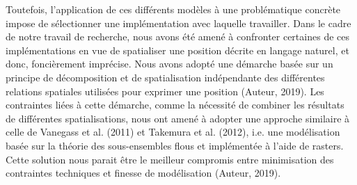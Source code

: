 Toutefois, l’application de ces différents modèles à une problématique
concrète impose de sélectionner une implémentation avec laquelle
travailler. Dans le cadre de notre travail de recherche, nous avons
été amené à confronter certaines de ces implémentations en vue de
spatialiser une position décrite en langage naturel, et donc,
foncièrement imprécise. Nous avons adopté une démarche basée sur un
principe de décomposition et de spatialisation indépendante des
différentes relations spatiales utilisées pour exprimer une position
(Auteur, 2019). Les contraintes liées à cette démarche, comme la
nécessité de combiner les résultats de différentes spatialisations,
nous ont amené à adopter une approche similaire à celle de Vanegass et
al. (2011) et Takemura et al. (2012), i.e. une modélisation basée sur
la théorie des sous-ensembles flous et implémentée à l’aide de
rasters. Cette solution nous parait être le meilleur compromis entre
minimisation des contraintes techniques et finesse de modélisation
(Auteur, 2019).

